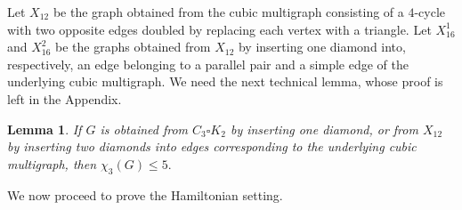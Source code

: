\documentclass[a4paper,11pt]{article}
\newtheorem{lemma}     	[theorem] {Lemma}
\theoremstyle{case}
\numberwithin{subcase}{case}
\begin{document}
Let $X_{12}$ be the graph obtained from the cubic multigraph consisting
of a $4$-cycle with two opposite edges doubled by replacing each
vertex with a triangle. Let $X_{16}^1$ and $X_{16}^2$ be the graphs
obtained from $X_{12}$ by inserting one diamond into, respectively,
an edge belonging to a parallel pair and a simple edge of the
underlying cubic multigraph.
We need the next technical lemma, whose proof is left in the Appendix.

\begin{lemma}\label{lem:small-diamond-insertions}
If $G$ is obtained from $C_3\square K_2$ by inserting one diamond, or
from $X_{12}$ by inserting two diamonds into edges corresponding to the
underlying cubic multigraph, then
$
\chi_3(G)\leq5.
$
\end{lemma}

We now proceed to prove the Hamiltonian setting.
\end{document}

